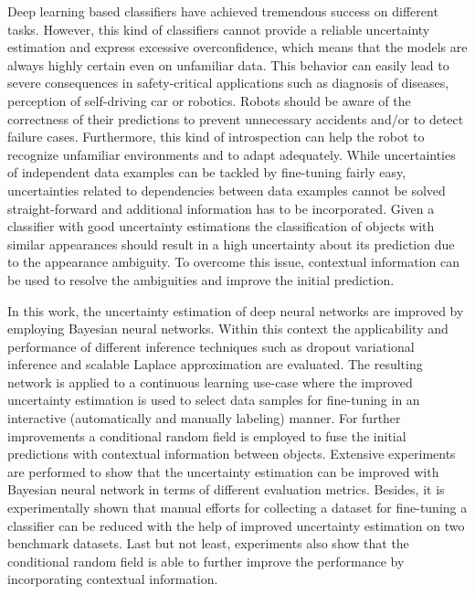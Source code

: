 Deep learning based classifiers have achieved tremendous success on different tasks. 
However, this kind of classifiers cannot provide a reliable uncertainty estimation and express excessive overconfidence, which means that the models are always highly certain even on unfamiliar data.
This behavior can easily lead to severe consequences in safety-critical applications such as diagnosis of diseases, perception of self-driving car or robotics. 
Robots should be aware of the correctness of their predictions to prevent unnecessary accidents and/or to detect failure cases.
Furthermore, this kind of introspection can help the robot to recognize unfamiliar environments and to adapt adequately.
While uncertainties of independent data examples can be tackled by fine-tuning fairly easy, uncertainties related to dependencies between data examples cannot be solved straight-forward and additional information has to be incorporated.
Given a classifier with good uncertainty estimations the classification of objects with similar appearances should result in a high uncertainty about its prediction due to the appearance ambiguity. To overcome this issue, contextual information can be used to resolve the ambiguities and improve the initial prediction.

In this work, the uncertainty estimation of deep neural networks are improved by employing Bayesian neural networks. 
Within this context the applicability and performance of different inference techniques such as dropout variational inference and scalable Laplace approximation are evaluated.
The resulting network is applied to a continuous learning use-case where the improved uncertainty estimation is used to select data samples for fine-tuning in an interactive (automatically and manually labeling) manner.
For further improvements a conditional random field is employed to fuse the initial predictions with contextual information between objects.
Extensive experiments are performed to show that the uncertainty estimation can be improved with Bayesian neural network in terms of different evaluation metrics.
Besides, it is experimentally shown that manual efforts for collecting a dataset for fine-tuning a classifier can be reduced with the help of improved uncertainty estimation on two benchmark datasets. 
Last but not least, experiments also show that the conditional random field is able to further improve the performance by incorporating contextual information.

\switchlanguage{\lang} %
